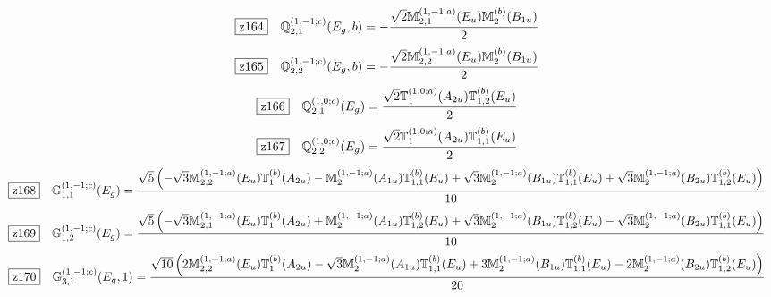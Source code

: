 \documentclass[fleqn,10pt,landscape]{jsarticle}
\begin{document}
\begin{dmath*}
\hspace*{3mm}\fbox{z164}\quad \mathbb{Q}_{2,1}^{(1,-1;c)}(E_{g},b)=- \frac{\sqrt{2} \mathbb{M}_{2,1}^{(1,-1;a)}(E_{u}) \mathbb{M}_{2}^{(b)}(B_{1u})}{2}
\end{dmath*}
\begin{dmath*}
\hspace*{3mm}\fbox{z165}\quad \mathbb{Q}_{2,2}^{(1,-1;c)}(E_{g},b)=- \frac{\sqrt{2} \mathbb{M}_{2,2}^{(1,-1;a)}(E_{u}) \mathbb{M}_{2}^{(b)}(B_{1u})}{2}
\end{dmath*}
\begin{dmath*}
\hspace*{3mm}\fbox{z166}\quad \mathbb{Q}_{2,1}^{(1,0;c)}(E_{g})=\frac{\sqrt{2} \mathbb{T}_{1}^{(1,0;a)}(A_{2u}) \mathbb{T}_{1,2}^{(b)}(E_{u})}{2}
\end{dmath*}
\begin{dmath*}
\hspace*{3mm}\fbox{z167}\quad \mathbb{Q}_{2,2}^{(1,0;c)}(E_{g})=\frac{\sqrt{2} \mathbb{T}_{1}^{(1,0;a)}(A_{2u}) \mathbb{T}_{1,1}^{(b)}(E_{u})}{2}
\end{dmath*}
\begin{dmath*}
\hspace*{3mm}\fbox{z168}\quad \mathbb{G}_{1,1}^{(1,-1;c)}(E_{g})=\frac{\sqrt{5} \left(- \sqrt{3} \mathbb{M}_{2,2}^{(1,-1;a)}(E_{u}) \mathbb{T}_{1}^{(b)}(A_{2u}) - \mathbb{M}_{2}^{(1,-1;a)}(A_{1u}) \mathbb{T}_{1,1}^{(b)}(E_{u}) + \sqrt{3} \mathbb{M}_{2}^{(1,-1;a)}(B_{1u}) \mathbb{T}_{1,1}^{(b)}(E_{u}) + \sqrt{3} \mathbb{M}_{2}^{(1,-1;a)}(B_{2u}) \mathbb{T}_{1,2}^{(b)}(E_{u})\right)}{10}
\end{dmath*}
\begin{dmath*}
\hspace*{3mm}\fbox{z169}\quad \mathbb{G}_{1,2}^{(1,-1;c)}(E_{g})=\frac{\sqrt{5} \left(- \sqrt{3} \mathbb{M}_{2,1}^{(1,-1;a)}(E_{u}) \mathbb{T}_{1}^{(b)}(A_{2u}) + \mathbb{M}_{2}^{(1,-1;a)}(A_{1u}) \mathbb{T}_{1,2}^{(b)}(E_{u}) + \sqrt{3} \mathbb{M}_{2}^{(1,-1;a)}(B_{1u}) \mathbb{T}_{1,2}^{(b)}(E_{u}) - \sqrt{3} \mathbb{M}_{2}^{(1,-1;a)}(B_{2u}) \mathbb{T}_{1,1}^{(b)}(E_{u})\right)}{10}
\end{dmath*}
\begin{dmath*}
\hspace*{3mm}\fbox{z170}\quad \mathbb{G}_{3,1}^{(1,-1;c)}(E_{g},1)=\frac{\sqrt{10} \left(2 \mathbb{M}_{2,2}^{(1,-1;a)}(E_{u}) \mathbb{T}_{1}^{(b)}(A_{2u}) - \sqrt{3} \mathbb{M}_{2}^{(1,-1;a)}(A_{1u}) \mathbb{T}_{1,1}^{(b)}(E_{u}) + 3 \mathbb{M}_{2}^{(1,-1;a)}(B_{1u}) \mathbb{T}_{1,1}^{(b)}(E_{u}) - 2 \mathbb{M}_{2}^{(1,-1;a)}(B_{2u}) \mathbb{T}_{1,2}^{(b)}(E_{u})\right)}{20}
\end{dmath*}
\end{document}
